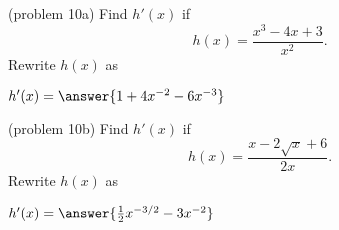 \documentclass[handout]{ximera}
\begin{document}
\begin{problem}(problem 10a)
Find $h'(x)$ if 
\[
h(x) = \frac{x^3 - 4x + 3}{x^2}.
\]
Rewrite $h(x)$ as
\begin{multipleChoice}
\end{multipleChoice}

$h'(x) = \answer{1 + 4x^{-2} -6x^{-3}}$

\end{problem}



\begin{problem}(problem 10b)
Find $h'(x)$ if 
\[
h(x) = \frac{x - 2\sqrt{x} + 6}{2x}.
\]
Rewrite $h(x)$ as
\begin{multipleChoice}
\end{multipleChoice}

$h'(x) = \answer{\frac12 x^{-3/2} -3x^{-2}}$

\end{problem}




\begin{center}
\begin{foldable}
\end{foldable}
\end{center}
\end{document}
